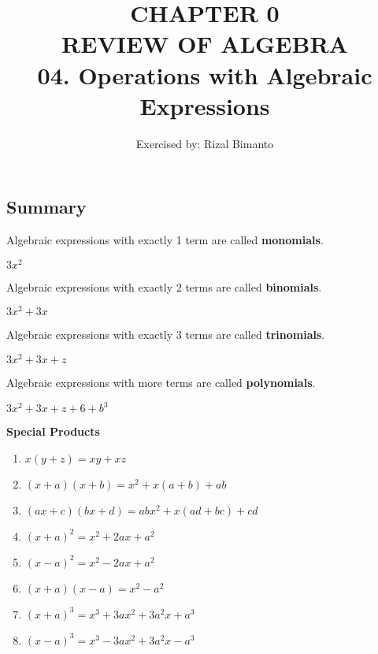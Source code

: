 \documentclass{article}
\title{CHAPTER 0\\
REVIEW OF ALGEBRA\\
04. Operations with Algebraic Expressions
}
\author{Exercised by: Rizal Bimanto}
\date{}
\begin{document}
\maketitle

\begin{onehalfspace}
    \section{Summary}\par

    Algebraic expressions with exactly 1 term are
    called \textbf{monomials}.
    \begin{center}
        $3x^{2}$
    \end{center}\par

    Algebraic expressions with exactly 2 terms are
    called \textbf{binomials}.
    \begin{center}
        $3x^{2} + 3x$
    \end{center}
    
    Algebraic expressions with exactly 3 terms are
    called \textbf{trinomials}.
    \begin{center}
        $3x^{2} + 3x + z$
    \end{center}

    Algebraic expressions with more terms are
    called \textbf{polynomials}.
    \begin{center}
        $3x^{2} + 3x + z + 6 + b^{3}$
    \end{center}
    \par

    \textbf{Special Products}
    \begin{enumerate}
        \item $x(y + z) = xy + xz$
        \item $(x + a)(x + b) = x^{2} + x(a + b) + ab$
        \item $(ax + c)(bx + d) = abx^{2} + x(ad + bc) + cd$
        \item $(x + a)^{2} = x^{2} + 2ax + a^{2}$
        \item $(x - a)^{2} = x^{2} -2ax + a^{2}$
        \item $(x + a)(x - a) = x^{2} - a^{2}$
        \item $(x + a)^{3} = x^{3} + 3ax^{2} + 3a^{2}x + a^{3}$
        \item $(x - a)^{3} = x^{3} - 3ax^{2} + 3a^{2}x - a^{3}$
    \end{enumerate}


\end{onehalfspace}
\end{document}
